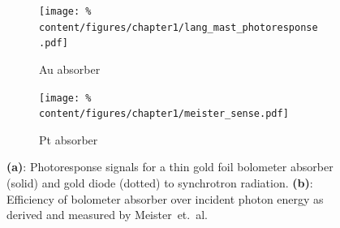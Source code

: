             \begin{figure}[t]%
                \centering%
                \begin{subfigure}{0.4\textwidth}%
                    \texttt{[image: \%
                        content/figures/chapter1/lang\_mast\_photoresponse.pdf]}%
                    \caption{Au absorber\cite{Lang1996}}\label{fig:au_absorber}%
                \end{subfigure}%
                \hspace*{0.75cm}%
                \begin{subfigure}{0.53\textwidth}%
                    \texttt{[image: \%
                        content/figures/chapter1/meister\_sense.pdf]}%
                    \caption{Pt absorber\cite{Meister2013}}\label{fig:pt_absorber}%
                \end{subfigure}%
                \caption{\textbf{(a)}: Photoresponse signals for a thin gold foil bolometer absorber (solid) and gold diode (dotted) to synchrotron radiation\cite{Lang1996}. \textbf{(b)}: Efficiency of bolometer absorber over incident photon energy as derived and measured by Meister~et.~al\cite{Meister2013}.}\label{fig:sensitivity_meister}%
            \end{figure}%
%
